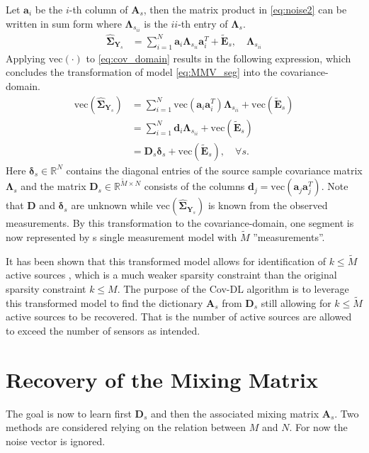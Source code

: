 Let $\textbf{a}_i$ be the $i$-th column of $\textbf{A}_s$, then the matrix product in \eqref{eq:noise2} can be written in sum form where $\boldsymbol{\Lambda}_{s_{ii}}$ is the $ii$-th entry of $\boldsymbol{\Lambda}_s$. 
\begin{align}
\widehat{\boldsymbol{\Sigma}}_{\mathbf{Y}_s} &= \sum_{i=1}^{N} \textbf{a}_i \boldsymbol{\Lambda}_{s_{ii}} \textbf{a}_i^{T} + \widetilde{\textbf{E}}_s, \quad \boldsymbol{\Lambda}_{s_{ii}} \label{eq:cov_domain}
\end{align}
Applying $\text{vec}(\cdot)$ to \eqref{eq:cov_domain} results in the following expression, which concludes the transformation of model \eqref{eq:MMV_seg} into the covariance-domain. 
\begin{align}
\text{vec}\left( \widehat{\boldsymbol{\Sigma}}_{\mathbf{Y}_s} \right) &= \sum_{i=1}^N \text{vec}(\mathbf{a}_i \mathbf{a}_i^T) \boldsymbol{\Lambda}_{s_{ii}} + \text{vec}( \widetilde{\textbf{E}}_s) \nonumber \\
&= \sum_{i=1}^N \mathbf{d}_i \boldsymbol{\Lambda}_{s_{ii}} + \text{vec}( \widetilde{\textbf{E}}_s) \nonumber \\
&= \mathbf{D}_s \boldsymbol{\delta}_s + \text{vec}( \widetilde{\textbf{E}}_s), \quad \forall s. \label{eq:cov1}
\end{align}
Here $\boldsymbol{\delta}_s \in \mathbb{R}^{N}$ contains the diagonal entries of the source sample covariance matrix $\boldsymbol{\Lambda}_s$
and the matrix $\mathbf{D}_s \in \mathbb{R}^{\widetilde{M} \times N}$ consists of the columns $\mathbf{d}_j = \text{vec}(\mathbf{a}_j \mathbf{a}_j^T)$. Note that $\mathbf{D}$ and $\boldsymbol{\delta}_s$ are unknown while $\text{vec}\left( \widehat{\boldsymbol{\Sigma}}_{\mathbf{Y}_s} \right)$ is known from the observed measurements.
By this transformation to the covariance-domain, one segment is now represented by s single measurement model with $\widetilde{M}$ ''measurements''. 

It has been shown that this transformed model allows for identification of $k \leq \widetilde{M}$ active sources \cite{Pal2015}, which is a much weaker sparsity constraint than the original sparsity constraint $k \leq M$. 
The purpose of the Cov-DL algorithm is to leverage this transformed model to find the dictionary $\mathbf{A}_s$ from $\mathbf{D}_s$ still allowing for $k \leq \widetilde{M}$ active sources to be recovered. 
That is the number of active sources are allowed to exceed the number of sensors as intended.

\section{Recovery of the Mixing Matrix}
The goal is now to learn first $\textbf{D}_s$ and then the associated mixing matrix $\textbf{A}_s$. 
Two methods are considered relying on the relation between $M$ and $N$. 
For now the noise vector is ignored.


